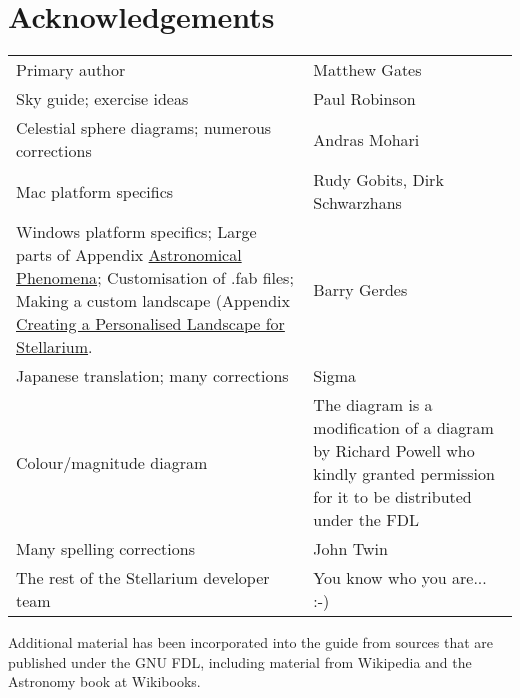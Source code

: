 
\chapter{Acknowledgements}

\begin{longtable}[c]{@{}ll@{}}
\toprule
Primary author & Matthew Gates \tabularnewline
Sky guide; exercise ideas & Paul Robinson\tabularnewline
Celestial sphere diagrams; numerous corrections & Andras
Mohari\tabularnewline
Mac platform specifics & Rudy Gobits, Dirk Schwarzhans\tabularnewline
Windows platform specifics; Large parts of Appendix
\href{Astronomical_Phenomena}{Astronomical Phenomena}; Customisation of
.fab files; Making a custom landscape (Appendix
\href{Creating_a_Personalised_Landscape_for_Stellarium}{Creating a
Personalised Landscape for Stellarium}. & Barry Gerdes\tabularnewline
Japanese translation; many corrections & Sigma\tabularnewline
Colour/magnitude diagram & The diagram is a modification of a diagram by
Richard Powell who kindly granted permission for it to be distributed
under the FDL\tabularnewline
Many spelling corrections & John Twin\tabularnewline
The rest of the Stellarium developer team & You know who you are...
:-)\tabularnewline
\bottomrule
\end{longtable}

Additional material has been incorporated into the guide from sources
that are published under the GNU FDL, including material from Wikipedia
and the Astronomy book at Wikibooks.
